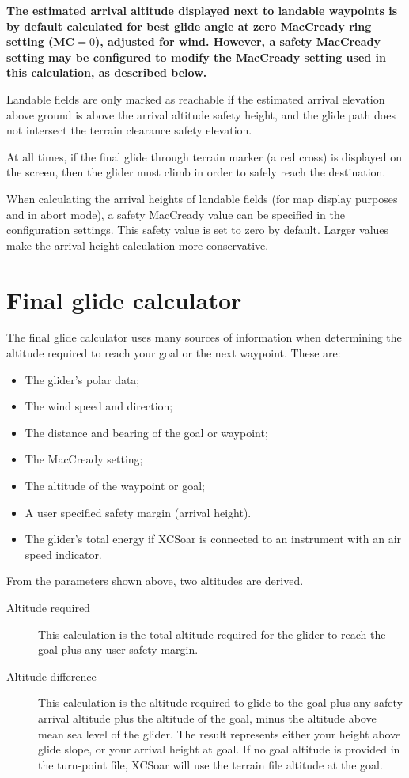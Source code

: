 \textbf{The estimated arrival altitude displayed next to landable
  waypoints is by default calculated for best glide angle at zero
  MacCready ring setting (MC$=0$), adjusted for wind.  However, a
  safety MacCready setting may be configured to modify the MacCready
  setting used in this calculation, as described below.}

Landable fields are only marked as reachable if the estimated arrival
elevation above ground is above the arrival altitude safety height,
and the glide path does not intersect the terrain clearance safety
elevation.

At all times, if the final glide through terrain marker (a red
cross) is displayed on the screen, then the glider must climb in order
to safely reach the destination.

When calculating the arrival heights of landable fields (for map
display purposes and in abort mode), a safety MacCready value can be
specified in the configuration settings.  This safety value is set to
zero by default.  Larger values make the arrival height calculation
more conservative.

\section{Final glide calculator}

The final glide calculator uses many sources of information when
determining the altitude required to reach your goal or the next
waypoint. These are:

\begin{itemize}
\item The glider's polar data;
\item The wind speed and direction;
\item The distance and bearing of the goal or waypoint;
\item The MacCready setting;
\item The altitude of the waypoint or goal;
\item A user specified safety margin (arrival height).
\item The glider's total energy if XCSoar is connected to
  an instrument with an air speed indicator.
\end{itemize}

From the parameters shown above, two altitudes are derived.
\begin{description}
\item[Altitude required]
This calculation is the total altitude required for the glider to
reach the goal plus any user safety margin. 
\item[Altitude difference]
This calculation is the altitude required to glide to the goal plus
any safety arrival altitude plus the altitude of the goal, minus the
altitude above mean sea level of the glider.  The result represents
either your height above glide slope, or your arrival height at goal.
If no goal altitude is provided in the turn-point file, XCSoar will use
the terrain file altitude at the goal.
\end{description}

